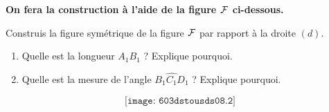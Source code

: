 {\bf On fera la construction à l'aide de la figure $\cal F$
ci-dessous.}
\begin{myenumerate}
\item Construis la figure symétrique de la figure $\cal F$ par rapport
à la droite $(d)$.
\begin{enumerate}
\item Quelle est la longueur $A_1B_1$ ? Explique pourquoi.
\item Quelle est la mesure de l'angle $\widehat{B_1C_1D_1}$ ? Explique pourquoi.
\end{enumerate}
\end{myenumerate}
\[\texttt{[image: 603dstousds08.2]}\]
